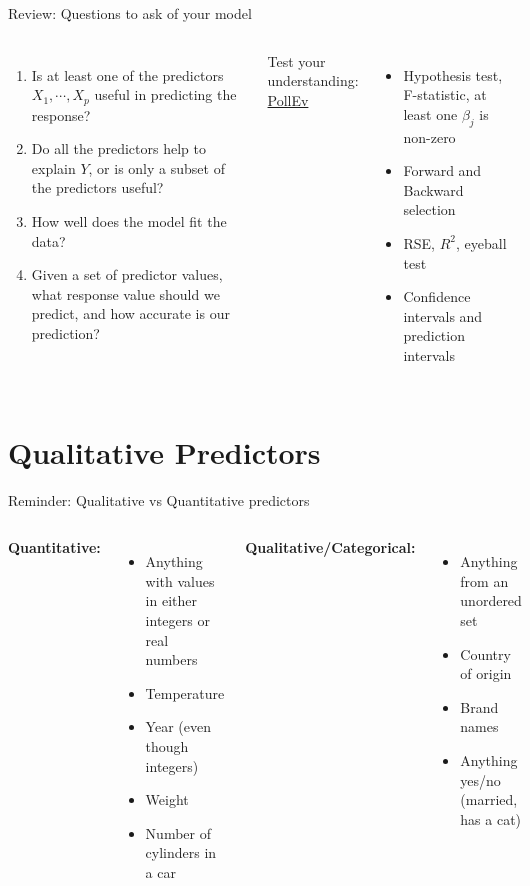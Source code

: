 \documentclass[aspectratio=169,usenames,dvipsnames]{beamer}
\newcommand{\InstructorList}[1]{
\begin{itemize}
	\color{orange}
	#1
\end{itemize}
}
\begin{document}
\begin{frame}[c]{Review: Questions to ask of your model }

	\begin{columns}
	\centering
	\begin{enumerate}
		\item Is at least one of the predictors $X_1, \cdots, X_p$ useful in predicting the response?
	\item Do all the predictors help to explain $Y$, or is only a subset of the predictors useful?
	\item How well does the model fit the data?
	\item Given a set of predictor values, what response value should we predict, and how accurate is our prediction?
	
	\end{enumerate}

	Test your understanding: \href{https://PollEv.com/multiple_choice_polls/mdZHSz9oQiNNvBuAYDjU0/respond}{PollEv}
	\centering
	\InstructorList{
	\item Hypothesis test, F-statistic, at least one $\beta_j$ is non-zero
	\item Forward and Backward selection
	\item RSE, $R^2$, eyeball test
	\item Confidence intervals and prediction intervals
	
	}
	\end{columns}
	
	\end{frame}
\section{Qualitative Predictors}
\begin{frame}[t]{Reminder: Qualitative vs Quantitative predictors}
\begin{columns}
\centering
\textbf{Quantitative:}
\InstructorList{
  \item Anything with values in either integers or real numbers 
  \item Temperature 
  \item Year (even though integers)
  \item Weight 
  \item Number of cylinders in a car 
}

\centering
\textbf{Qualitative/Categorical:}
\InstructorList{
  \item Anything from an unordered set 
  \item Country of origin 
  \item Brand names 
  \item Anything yes/no (married, has a cat)
}

\end{columns}
\end{frame}
\end{document}
